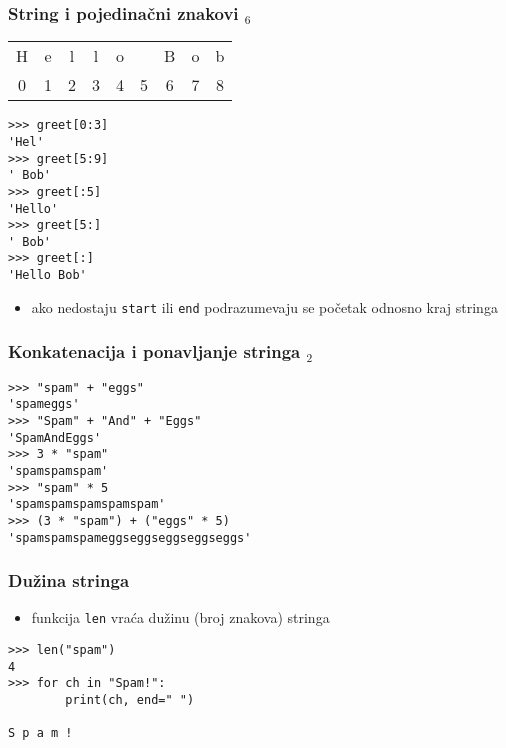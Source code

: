 \documentclass[utf8,compress,aspectratio=169]{beamer}
\begin{document}
\begin{frame}[fragile]
  \frametitle{String i pojedinačni znakovi $_6$}
\begin{tabular}{|c|c|c|c|c|c|c|c|c|}
\cline{1-9}
H & e & l & l & o & \  & B & o & b \\ \cline{1-9}
\multicolumn{1}{c}{0} & \multicolumn{1}{c}{1} & \multicolumn{1}{c}{2} & \multicolumn{1}{c}{3} & \multicolumn{1}{c}{4} & \multicolumn{1}{c}{5} & \multicolumn{1}{c}{6} & \multicolumn{1}{c}{7} & \multicolumn{1}{c}{8}
\end{tabular}
\begin{verbatim}
>>> greet[0:3]
'Hel'
>>> greet[5:9]
' Bob'
>>> greet[:5]
'Hello'
>>> greet[5:]
' Bob'
>>> greet[:]
'Hello Bob'
\end{verbatim}
  \begin{itemize}
    \item ako nedostaju \texttt{start} ili \texttt{end} podrazumevaju se početak odnosno kraj stringa
  \end{itemize}
\end{frame}


\begin{frame}[fragile]
  \frametitle{Konkatenacija i ponavljanje stringa $_2$}
\begin{verbatim}
>>> "spam" + "eggs"
'spameggs'
>>> "Spam" + "And" + "Eggs"
'SpamAndEggs'
>>> 3 * "spam"
'spamspamspam'
>>> "spam" * 5
'spamspamspamspamspam'
>>> (3 * "spam") + ("eggs" * 5)
'spamspamspameggseggseggseggseggs'
\end{verbatim}
\end{frame}

\begin{frame}[fragile]
  \frametitle{Dužina stringa}
  \begin{itemize}
    \item funkcija \texttt{len} vraća dužinu (broj znakova) stringa
  \end{itemize}
\begin{verbatim}
>>> len("spam")
4
>>> for ch in "Spam!":
        print(ch, end=" ")

S p a m !
\end{verbatim}
\end{frame}
\end{document}
